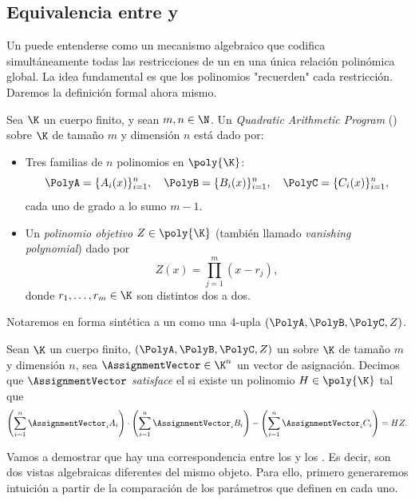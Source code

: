 
\subsection{Equivalencia entre \ROneCS y \QAP}

Un \QAP puede entenderse como un mecanismo algebraico que codifica simultáneamente todas las restricciones de un \ROneCS en una única relación polinómica global. La idea fundamental es que los polinomios "recuerden" cada restricción. Daremos la definición formal ahora mismo.

\begin{definition}
	Sea $\K$ un cuerpo finito, y sean $m, n \in \N$. Un \emph{Quadratic Arithmetic Program} (\QAP) sobre $\K$ de tamaño $m$ y dimensión $n$ está dado por:
	\begin{itemize}[no]
		\item Tres familias de $n$ polinomios en $\poly{\K}$:
		$$\PolyA = \{A_i(x)\}^n_{i=1}, \quad \PolyB = \{B_i(x)\}^n_{i=1}, \quad \PolyC = \{C_i(x)\}^n_{i=1},$$
		cada uno de grado a lo sumo $m - 1$.
		\item Un \emph{polinomio objetivo} $Z \in \poly{\K}$ (también llamado \emph{vanishing polynomial}) dado por
		$$Z(x) = \prod_{j=1}^{m}(x - r_j),$$
		donde $r_1, \ldots, r_m \in \K$ son distintos dos a dos.
	\end{itemize}
	Notaremos en forma sintética a un \QAP como una $4$-upla $\left(\PolyA, \PolyB, \PolyC, Z\right)$.
\end{definition}

\begin{definition}
	Sean $\K$ un cuerpo finito, $(\PolyA, \PolyB, \PolyC, Z)$ un \QAP sobre $\K$ de tamaño $m$ y dimensión $n$, sea $\AssignmentVector \in \K^n$ un vector de asignación. Decimos que $\AssignmentVector$ \emph{satisface} el \QAP si existe un polinomio $H \in \poly{\K}$ tal que
	$$\left(\sum_{i=1}^{n} \AssignmentVector_i A_i\right) \cdot \left(\sum_{i=1}^{n} \AssignmentVector_i B_i \right) - \left(\sum_{i=1}^{n} \AssignmentVector_i C_i\right) = HZ.$$
\end{definition}

Vamos a demostrar que hay una correspondencia entre los \ROneCS y los \QAP. Es decir, son dos vistas algebraicas diferentes del mismo objeto. Para ello, primero generaremos intuición a partir de la comparación de los parámetros que definen en cada uno.

